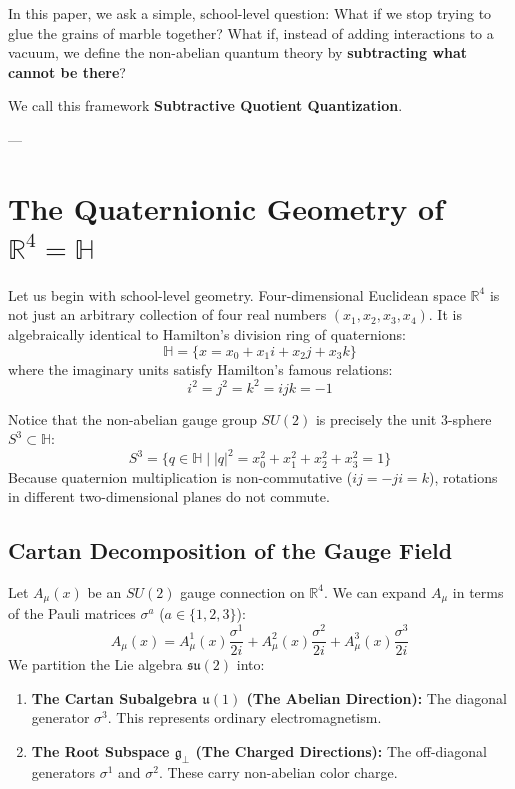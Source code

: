 \documentclass[11pt,a4paper]{article}
\begin{document}
In this paper, we ask a simple, school-level question: What if we stop trying to glue the grains of marble together? What if, instead of adding interactions to a vacuum, we define the non-abelian quantum theory by \textbf{subtracting what cannot be there}?

We call this framework \textbf{Subtractive Quotient Quantization}.

---

\section{The Quaternionic Geometry of \texorpdfstring{$\mathbb{R}^4 = \mathbb{H}$}{R4 = H}}

Let us begin with school-level geometry. Four-dimensional Euclidean space $\mathbb{R}^4$ is not just an arbitrary collection of four real numbers $(x_1, x_2, x_3, x_4)$. It is algebraically identical to Hamilton's division ring of quaternions:
$$\mathbb{H} = \{x = x_0 + x_1 i + x_2 j + x_3 k\}$$
where the imaginary units satisfy Hamilton's famous relations:
$$i^2 = j^2 = k^2 = ijk = -1$$

Notice that the non-abelian gauge group $SU(2)$ is precisely the unit 3-sphere $S^3 \subset \mathbb{H}$:
$$S^3 = \{q \in \mathbb{H} \mid |q|^2 = x_0^2 + x_1^2 + x_2^2 + x_3^2 = 1\}$$
Because quaternion multiplication is non-commutative ($ij = -ji = k$), rotations in different two-dimensional planes do not commute.

\subsection{Cartan Decomposition of the Gauge Field}
Let $A_\mu(x)$ be an $SU(2)$ gauge connection on $\mathbb{R}^4$. We can expand $A_\mu$ in terms of the Pauli matrices $\sigma^a$ ($a \in \{1, 2, 3\}$):
$$A_\mu(x) = A_\mu^1(x) \frac{\sigma^1}{2i} + A_\mu^2(x) \frac{\sigma^2}{2i} + A_\mu^3(x) \frac{\sigma^3}{2i}$$
We partition the Lie algebra $\mathfrak{su}(2)$ into:
\begin{enumerate}
    \item \textbf{The Cartan Subalgebra $\mathfrak{u}(1)$ (The Abelian Direction):} The diagonal generator $\sigma^3$. This represents ordinary electromagnetism.
    \item \textbf{The Root Subspace $\mathfrak{g}_\perp$ (The Charged Directions):} The off-diagonal generators $\sigma^1$ and $\sigma^2$. These carry non-abelian color charge.
\end{enumerate}
\end{document}
